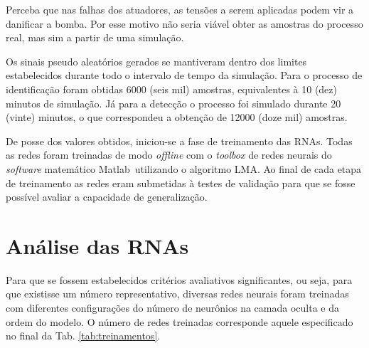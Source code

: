 Perceba que nas falhas dos atuadores, as tensões a serem aplicadas podem vir a
danificar a bomba. Por esse motivo não seria viável obter as amostras do
processo real, mas sim a partir de uma simulação.

Os sinais pseudo aleatórios gerados se mantiveram dentro dos limites
estabelecidos durante todo o intervalo de tempo da simulação. Para o processo de
identificação foram obtidas 6000 (seis mil) amostras, equivalentes à 10 (dez)
minutos de simulação. Já para a detecção o processo foi simulado durante 20
(vinte) minutos, o que correspondeu a obtenção de 12000 (doze mil) amostras.

De posse dos valores obtidos, iniciou-se a fase de treinamento das RNAs. Todas
as redes foram treinadas de modo {\it offline} com o {\it toolbox} de redes
neurais do {\it software} matemático Matlab\reg\ utilizando o algoritmo LMA. Ao
final de cada etapa de treinamento as redes eram submetidas à testes de
validação para que se fosse possível avaliar a capacidade de generalização.

\section{Análise das RNAs}
Para que se fossem estabelecidos critérios avaliativos significantes, ou seja,
para que existisse um número representativo, diversas redes neurais foram
treinadas com diferentes configurações do número de neurônios na camada oculta e
da ordem do modelo. O número de redes treinadas corresponde aquele especificado
no final da Tab. \ref{tab:treinamentos}. 


